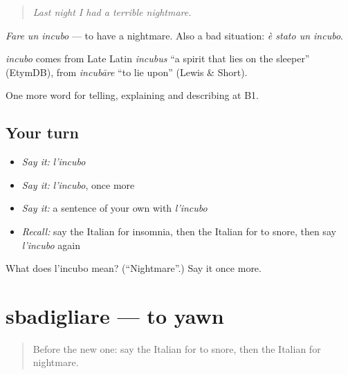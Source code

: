 \begin{quote}
\emph{Last night I had a terrible nightmare.}
\end{quote}

\emph{Fare un incubo} — to have a nightmare. Also a bad situation: \emph{è stato un incubo}.

\begin{cousinweb}
\emph{incubo} comes from Late Latin \emph{incubus} \textquotedblleft{}a spirit that lies on the sleeper\textquotedblright{} (EtymDB), from \emph{incubāre} \textquotedblleft{}to lie upon\textquotedblright{} (Lewis \& Short).
\end{cousinweb}

\begin{grammarlens}[title={What you've built}]
One more word for telling, explaining and describing at B1.
\end{grammarlens}

\subsection*{Your turn}
\begin{itemize}
\raggedright
  \item \emph{Say it:} \emph{l'incubo}
  \item \emph{Say it:} \emph{l'incubo}, once more
  \item \emph{Say it:} a sentence of your own with \emph{l'incubo}
  \item \emph{Recall:} say the Italian for insomnia, then the Italian for to snore, then say \emph{l'incubo} again
\end{itemize}

\begin{tcolorbox}[breakable,colback=teal!4,colframe=teal!35!black,title={Before you move on}]
What does l'incubo mean? (\textquotedblleft{}Nightmare\textquotedblright{}.) Say it once more.
\end{tcolorbox}
\section[sbadigliare]{sbadigliare — to yawn}

\label{lesson:IT-C490-sbadigliare}



\begin{quote}
Before the new one: say the Italian for to snore, then the Italian for nightmare.
\end{quote}

